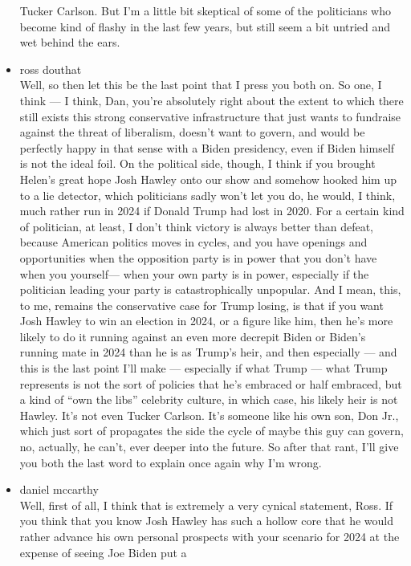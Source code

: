 \begin{itemize}
  Tucker Carlson. But I'm a little bit skeptical of some of the
  politicians who become kind of flashy in the last few years, but still
  seem a bit untried and wet behind the ears.
\item
  ross douthat\\
  Well, so then let this be the last point that I press you both on. So
  one, I think --- I think, Dan, you're absolutely right about the
  extent to which there still exists this strong conservative
  infrastructure that just wants to fundraise against the threat of
  liberalism, doesn't want to govern, and would be perfectly happy in
  that sense with a Biden presidency, even if Biden himself is not the
  ideal foil. On the political side, though, I think if you brought
  Helen's great hope Josh Hawley onto our show and somehow hooked him up
  to a lie detector, which politicians sadly won't let you do, he would,
  I think, much rather run in 2024 if Donald Trump had lost in 2020. For
  a certain kind of politician, at least, I don't think victory is
  always better than defeat, because American politics moves in cycles,
  and you have openings and opportunities when the opposition party is
  in power that you don't have when you yourself--- when your own party
  is in power, especially if the politician leading your party is
  catastrophically unpopular. And I mean, this, to me, remains the
  conservative case for Trump losing, is that if you want Josh Hawley to
  win an election in 2024, or a figure like him, then he's more likely
  to do it running against an even more decrepit Biden or Biden's
  running mate in 2024 than he is as Trump's heir, and then especially
  --- and this is the last point I'll make --- especially if what Trump
  --- what Trump represents is not the sort of policies that he's
  embraced or half embraced, but a kind of ``own the libs'' celebrity
  culture, in which case, his likely heir is not Hawley. It's not even
  Tucker Carlson. It's someone like his own son, Don Jr., which just
  sort of propagates the side the cycle of maybe this guy can govern,
  no, actually, he can't, ever deeper into the future. So after that
  rant, I'll give you both the last word to explain once again why I'm
  wrong.
\item
  daniel mccarthy\\
  Well, first of all, I think that is extremely a very cynical
  statement, Ross. If you think that you know Josh Hawley has such a
  hollow core that he would rather advance his own personal prospects
  with your scenario for 2024 at the expense of seeing Joe Biden put a

\end{itemize}
